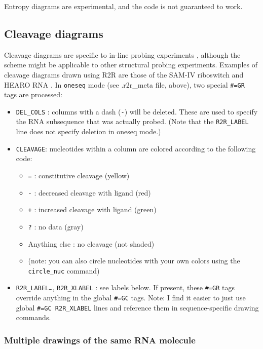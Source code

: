 \documentclass[letterpaper,12pt]{report}
\begin{document}
Entropy diagrams are experimental, and the code is not guaranteed
to work.

\subsection{Cleavage diagrams}
\label{cleavage}

Cleavage diagrams are specific to in-line probing 
experiments \cite{inlines}, although the scheme might be applicable
to other structural probing experiments.
Examples of cleavage diagrams drawn using R2R are
those of the SAM-IV riboswitch \cite[Fig. 2(A)]{SAMIV} and HEARO RNA \cite[Supplementary Fig. 8(b)]{CoolRNAs}.
In {\tt oneseq} mode (see .r2r\_meta file,
above), two special {\tt \#=GR} tags are processed:

\begin{itemize}
\item {\tt DEL\_COLS} : columns with a dash
({\tt -}) will be deleted.  These are used to
specify the RNA subsequence that was actually probed.  (Note that the
{\tt R2R\_LABEL} line does not specify deletion in oneseq mode.)
\item {\tt CLEAVAGE}: nucleotides within a column are colored according to the
following code:

\begin{itemize}
\item {\tt =}  : constitutive cleavage (yellow)
\item {\tt -}  :  decreased cleavage with ligand (red)
\item {\tt +} : increased cleavage with ligand (green)
\item {\tt ?} : no data (gray)
\item Anything else : no cleavage (not shaded)
\item (note: you can also circle nucleotides with your own colors using
the {\tt circle\_nuc} command)
\end{itemize}
\item {\tt R2R\_LABEL{\dots}}, {\tt R2R\_XLABEL} : see labels below.  If present,
these {\tt \#=GR} tags override anything in the global {\tt \#=GC} tags.
Note: I find it easier to just use global {\tt \#=GC R2R\_XLABEL} lines and reference them in sequence-specific drawing commands.

\end{itemize}

\subsubsection{Multiple drawings of the same RNA molecule}
\end{document}
